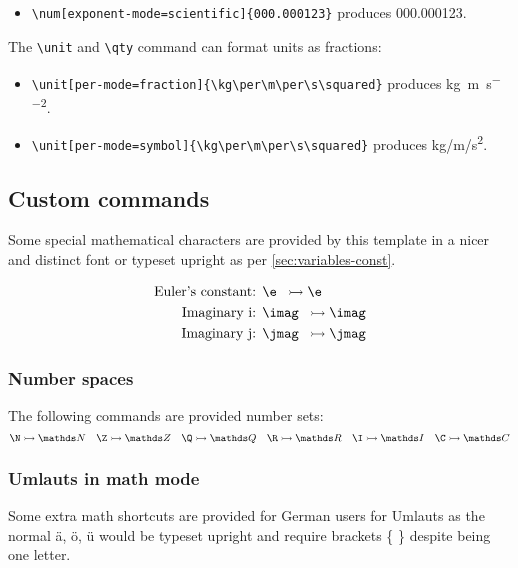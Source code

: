         \begin{itemize}
            \item \verb|\num[exponent-mode=scientific]{000.000123}| produces \num[exponent-mode=scientific]{000.000123}.
        \end{itemize}

        The \verb|\unit| and \verb|\qty| command can format units as fractions:
        \begin{itemize}
            \item \verb|\unit[per-mode=fraction]{\kg\per\m\per\s\squared}|
               produces \unit[per-mode=fraction]{\kg\per\m\per\s\squared}.
            \item \verb|\unit[per-mode=symbol]{\kg\per\m\per\s\squared}|
               produces \unit[per-mode=symbol]{\kg\per\m\per\s\squared}.
        \end{itemize}

\subsection{Custom commands}
    Some special mathematical characters are provided by this template in a nicer and distinct font or typeset upright as per \cref{sec:variables-const}.

    \begin{align*}
        \text{Euler's constant: } & \texttt{\tb e    } \rat  \e    \\
        \text{Imaginary i: }      & \texttt{\tb imag } \rat  \imag \\
        \text{Imaginary j: }      & \texttt{\tb jmag } \rat  \jmag
    \end{align*}

    \subsubsection{Number spaces}
        The following commands are provided number sets:
        \[
            \verb|\N| \rat \N \quad
            \verb|\Z| \rat \Z \quad
            \verb|\Q| \rat \Q \quad
            \verb|\R| \rat \R \quad
            \verb|\I| \rat \I \quad
            \verb|\C| \rat \C
        \]

    \subsubsection{Umlauts in math mode}
        Some extra math shortcuts are provided for German users for Umlauts as the normal ä, ö, ü would be typeset upright and require brackets \{ \} despite being one letter.

